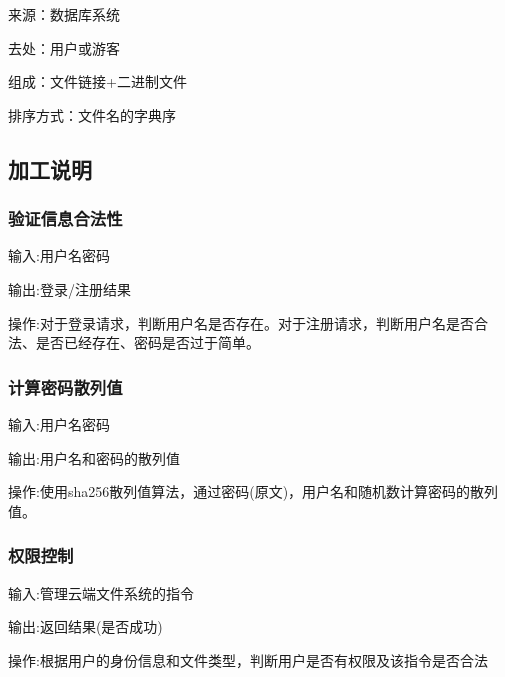 来源：数据库系统

去处：用户或游客

组成：文件链接+二进制文件

排序方式：文件名的字典序

\subsection{加工说明}
\subsubsection{验证信息合法性}
输入:用户名密码

输出:登录/注册结果

操作:对于登录请求，判断用户名是否存在。对于注册请求，判断用户名是否合法、是否已经存在、密码是否过于简单。

\subsubsection{计算密码散列值}
输入:用户名密码

输出:用户名和密码的散列值

操作:使用sha256散列值算法，通过密码(原文)，用户名和随机数计算密码的散列值。

\subsubsection{权限控制}
输入:管理云端文件系统的指令

输出:返回结果(是否成功)

操作:根据用户的身份信息和文件类型，判断用户是否有权限及该指令是否合法